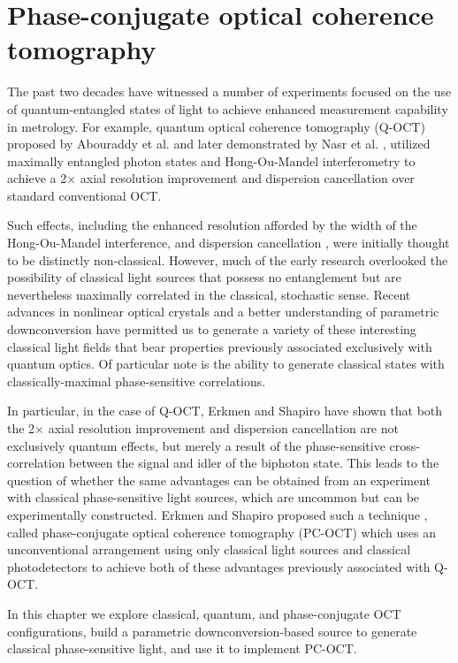 \chapter{Phase-conjugate optical coherence tomography}

The past two decades have witnessed a number of experiments focused on the use of quantum-entangled states of light to achieve enhanced measurement capability in metrology. For example, quantum optical coherence tomography (Q-OCT) proposed by Abouraddy et al. \cite{abouraddy-qoct} and later demonstrated by Nasr et al. \cite{nasr-qoct}, utilized maximally entangled photon states and Hong-Ou-Mandel interferometry \cite{hong-interference} to achieve a 2$\times$ axial resolution improvement and dispersion cancellation over standard conventional OCT.

Such effects, including the enhanced resolution afforded by the width of the Hong-Ou-Mandel interference, and dispersion cancellation \cite{steinberg-dispersion,franson-dispersion}, were initially thought to be distinctly non-classical. However, much of the early research overlooked the possibility of classical light sources that possess no entanglement but are nevertheless maximally correlated in the classical, stochastic sense. Recent advances in nonlinear optical crystals and a better understanding of parametric downconversion have permitted us to generate a variety of these interesting classical light fields that bear properties previously associated exclusively with quantum optics. Of particular note is the ability to generate classical states with classically-maximal phase-sensitive correlations.

In particular, in the case of Q-OCT, Erkmen and Shapiro \cite{erkmen-pcoct} have shown that both the 2$\times$ axial resolution improvement and dispersion cancellation are not exclusively quantum effects, but merely a result of the phase-sensitive cross-correlation between the signal and idler of the biphoton state. This leads to the question of whether the same advantages can be obtained from an experiment with classical phase-sensitive light sources, which are uncommon but can be experimentally constructed. Erkmen and Shapiro proposed such a technique \cite{erkmen-pcoct}, called phase-conjugate optical coherence tomography (PC-OCT) which uses an unconventional arrangement using only classical light sources and classical photodetectors to achieve both of these advantages previously associated with Q-OCT.

In this chapter we explore classical, quantum, and phase-conjugate OCT configurations, build a parametric downconversion-based source to generate classical phase-sensitive light, and use it to implement PC-OCT.

